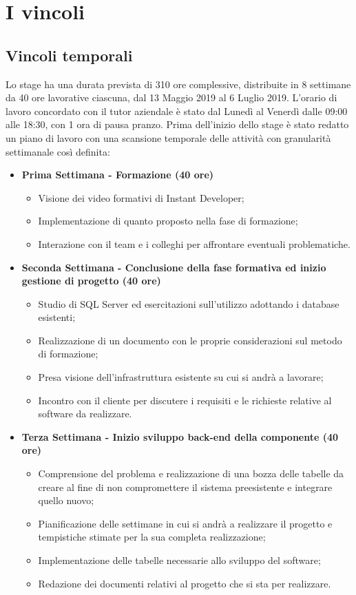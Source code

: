 \section{I vincoli}
\subsection{Vincoli temporali}
Lo stage ha una durata prevista di 310 ore complessive, distribuite in 8 settimane da 40 ore lavorative ciascuna, dal 13 Maggio 2019 al 6 Luglio 2019. L'orario di lavoro concordato con il tutor aziendale è stato dal Lunedì al Venerdì dalle 09:00 alle 18:30, con 1 ora di pausa pranzo. Prima dell'inizio dello stage è stato redatto un piano di lavoro con una scansione temporale delle attività con granularità settimanale così definita:
\begin{itemize}
	
	\item \textbf{Prima Settimana - Formazione (40 ore)}
	\begin{itemize}
		\item Visione dei video formativi di Instant Developer;
		\item Implementazione di quanto proposto nella fase di formazione;
		\item Interazione con il team e i colleghi per affrontare eventuali problematiche.
		
	\end{itemize}
	\item \textbf{Seconda Settimana - Conclusione della fase formativa ed inizio gestione di progetto (40 ore)} 
	\begin{itemize}
		\item Studio di SQL Server ed esercitazioni sull'utilizzo adottando i database esistenti;
		\item Realizzazione di un documento con le proprie considerazioni sul metodo di formazione;
		\item Presa visione dell'infrastruttura esistente su cui si andrà a lavorare; 
		\item Incontro con il cliente per discutere i requisiti e le richieste relative al software da realizzare.
	\end{itemize}
	
	\item \textbf{Terza Settimana - Inizio sviluppo back-end della componente (40 ore)} 
	\begin{itemize}
		\item Comprensione del problema e realizzazione di una bozza delle tabelle da creare al fine di non compromettere il sistema preesistente e integrare quello nuovo;
		\item Pianificazione delle settimane in cui si andrà a realizzare il progetto e tempistiche stimate per la sua completa realizzazione;
		\item Implementazione delle tabelle necessarie allo sviluppo del software;
		\item Redazione dei documenti relativi al progetto che si sta per realizzare.
	\end{itemize}
	

\end{itemize}
